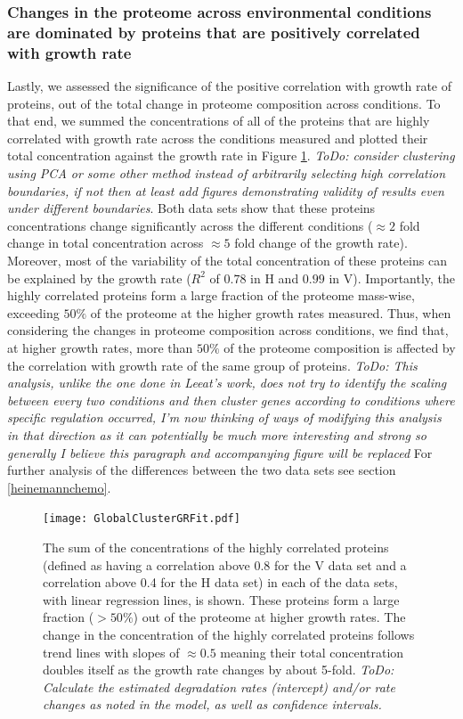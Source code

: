 \documentclass[notitlepage]{article}
\begin{document}
\subsubsection{Changes in the proteome across environmental conditions are dominated by proteins that are positively correlated with growth rate}
Lastly, we assessed the significance of the positive correlation with growth rate of proteins, out of the total change in proteome composition across conditions.
To that end, we summed the concentrations of all of the proteins that are highly correlated with growth rate across the conditions measured and plotted their total concentration against the growth rate in Figure \ref{fig:globalgrcorr}.
\emph{ToDo: consider clustering using PCA or some other method instead of arbitrarily selecting high correlation boundaries, if not then at least add figures demonstrating validity of results even under different boundaries}.
Both data sets show that these proteins concentrations change significantly across the different conditions ($\approx 2$ fold change in total concentration across $\approx 5$ fold change of the growth rate).
Moreover, most of the variability of the total concentration of these proteins can be explained by the growth rate ($R^2$ of $0.78$ in H and $0.99$ in V). 
Importantly, the highly correlated proteins form a large fraction of the proteome mass-wise, exceeding $50\%$ of the proteome at the higher growth rates measured.
Thus, when considering the changes in proteome composition across conditions, we find that, at higher growth rates, more than $50\%$ of the proteome composition is affected by the correlation with growth rate of the same group of proteins.
\emph{ToDo: This analysis, unlike the one done in Leeat's work, does not try to identify the scaling between every two conditions and then cluster genes according to conditions where specific regulation occurred, I'm now thinking of ways of modifying this analysis in that direction as it can potentially be much more interesting and strong so generally I believe this paragraph and accompanying figure will be replaced}
For further analysis of the differences between the two data sets see section \ref{heinemannchemo}.

\begin{figure}[h]
\centering
\texttt{[image: GlobalClusterGRFit.pdf]}
\caption{
The sum of the concentrations of the highly correlated proteins (defined as having a correlation above 0.8 for the V data set and a correlation above 0.4 for the H data set) in each of the data sets, with linear regression lines, is shown.
These proteins form a large fraction ($>50\%$) out of the proteome at higher growth rates.
The change in the concentration of the highly correlated proteins follows trend lines with slopes of $\approx 0.5$ meaning their total concentration doubles itself as the growth rate changes by about 5-fold.
\emph{ToDo: Calculate the estimated degradation rates (intercept) and/or rate changes as noted in the model, as well as confidence intervals.}
}
\label{fig:globalgrcorr}
\end{figure}
\end{document}
